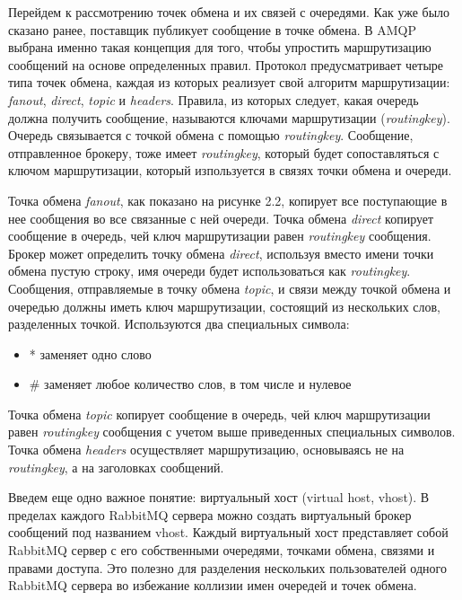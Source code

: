 Перейдем к рассмотрению точек обмена и их связей с очередями. Как уже было сказано ранее, поставщик публикует сообщение в точке обмена. В AMQP выбрана именно такая концепция для того, чтобы упростить маршрутизацию сообщений на основе определенных правил. Протокол предусматривает четыре типа точек обмена, каждая из которых реализует свой алгоритм маршрутизации: \textit{fanout}, \textit{direct}, \textit{topic} и \textit{headers}. Правила, из которых следует, какая очередь должна получить сообщение, называются ключами маршрутизации (\textit{routing\underline{\hspace{0.25cm}}key}). Очередь связывается с точкой обмена с помощью \textit{routing\underline{\hspace{0.25cm}}key}. Сообщение, отправленное брокеру, тоже имеет  \textit{routing\underline{\hspace{0.25cm}}key}, который будет сопоставляться с ключом маршрутизации, который изпользуется в связях точки обмена и очереди.\par
Точка обмена \textit{fanout}, как показано на рисунке 2.2, копирует все поступающие в нее сообщения во все связанные с ней очереди. Точка обмена \textit{direct} копирует сообщение в очередь, чей ключ маршрутизации равен \textit{routing\underline{\hspace{0.25cm}}key} сообщения. Брокер может определить точку обмена \textit{direct}, используя вместо имени точки обмена пустую строку, имя очереди будет использоваться как \textit{routing\underline{\hspace{0.25cm}}key}. Сообщения, отправляемые в точку обмена \textit{topic}, и связи между точкой обмена и очередью должны иметь ключ маршрутизации, состоящий из нескольких слов, разделенных точкой. Используются два специальных символа:
\begin{itemize}
\item * заменяет одно слово
\item \# заменяет любое количество слов, в том числе и нулевое
\end{itemize}
Точка обмена \textit{topic} копирует сообщение в очередь, чей ключ маршрутизации равен \textit{routing\underline{\hspace{0.25cm}}key} сообщения с учетом выше приведенных специальных символов. Точка обмена \textit{headers} осуществляет маршрутизацию, основываясь не на \textit{routing\underline{\hspace{0.25cm}}key}, а на заголовках сообщений.\par
Введем еще одно важное понятие: виртуальный хост (virtual host, vhost). В пределах каждого RabbitMQ сервера можно создать виртуальный брокер сообщений под названием vhost. Каждый виртуальный хост представляет собой RabbitMQ сервер с его собственными очередями, точками обмена, связями и правами доступа. Это полезно для разделения нескольких пользователей одного RabbitMQ сервера во избежание коллизии имен очередей и точек обмена. 
